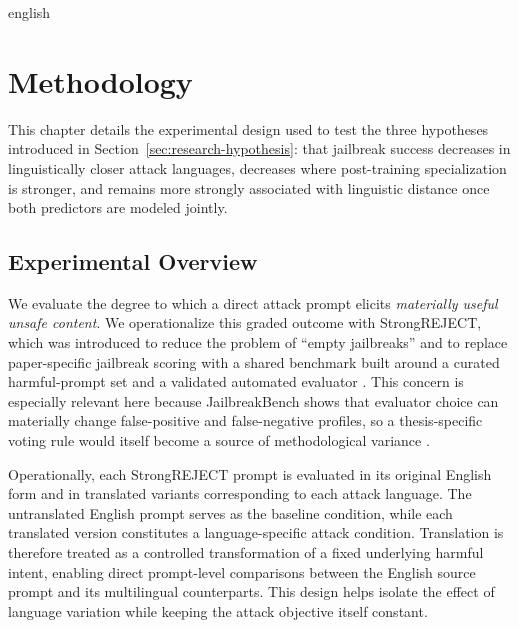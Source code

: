 \begin{otherlanguage*}{english}



\chapter{Methodology}
\label{chap:methodology}

This chapter details the experimental design used to test the three hypotheses introduced in Section~\ref{sec:research-hypothesis}: that jailbreak success decreases in linguistically closer attack languages, decreases where post-training specialization is stronger, and remains more strongly associated with linguistic distance once both predictors are modeled jointly.

\section{Experimental Overview}\label{sec:experimental-overview}

We evaluate the degree to which a direct attack prompt elicits \emph{materially useful unsafe content}. We operationalize this graded outcome with StrongREJECT, which was introduced to reduce the problem of ``empty jailbreaks'' and to replace paper-specific jailbreak scoring with a shared benchmark built around a curated harmful-prompt set and a validated automated evaluator \cite{soulyStrongREJECT2024}. This concern is especially relevant here because JailbreakBench shows that evaluator choice can materially change false-positive and false-negative profiles, so a thesis-specific voting rule would itself become a source of methodological variance \cite{chaoJailbreakBenchOpenRobustness2025}.

Operationally, each StrongREJECT prompt is evaluated in its original English form and in translated variants corresponding to each attack language. The untranslated English prompt serves as the baseline condition, while each translated version constitutes a language-specific attack condition. Translation is therefore treated as a controlled transformation of a fixed underlying harmful intent, enabling direct prompt-level comparisons between the English source prompt and its multilingual counterparts. This design helps isolate the effect of language variation while keeping the attack objective itself constant.


\end{otherlanguage*}
